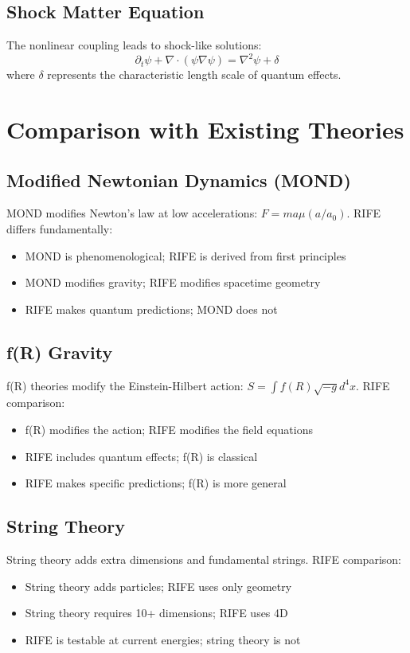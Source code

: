 \documentclass[11pt]{article}
\begin{document}
\subsection{Shock Matter Equation}
The nonlinear coupling leads to shock-like solutions:
\begin{equation}
\partial_t\psi + \nabla \cdot (\psi\nabla\psi) = \nabla^2\psi + \delta
\end{equation}
where $\delta$ represents the characteristic length scale of quantum effects.

\section{Comparison with Existing Theories}

\subsection{Modified Newtonian Dynamics (MOND)}
MOND modifies Newton's law at low accelerations: $F = ma\mu(a/a_0)$. RIFE differs fundamentally:
\begin{itemize}
\item MOND is phenomenological; RIFE is derived from first principles
\item MOND modifies gravity; RIFE modifies spacetime geometry
\item RIFE makes quantum predictions; MOND does not
\end{itemize}

\subsection{f(R) Gravity}
f(R) theories modify the Einstein-Hilbert action: $S = \int f(R)\sqrt{-g}d^4x$. RIFE comparison:
\begin{itemize}
\item f(R) modifies the action; RIFE modifies the field equations
\item RIFE includes quantum effects; f(R) is classical
\item RIFE makes specific predictions; f(R) is more general
\end{itemize}

\subsection{String Theory}
String theory adds extra dimensions and fundamental strings. RIFE comparison:
\begin{itemize}
\item String theory adds particles; RIFE uses only geometry
\item String theory requires 10+ dimensions; RIFE uses 4D
\item RIFE is testable at current energies; string theory is not
\end{itemize}
\end{document}
